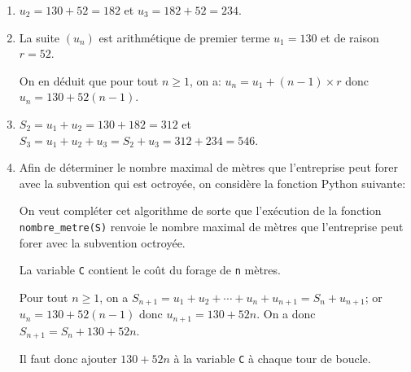 \begin{enumerate}
\item  $u_2=130+52=182$ et $u_3=182+52= 234$.
\item La suite $\left(u_n\right)$ est arithmétique de premier terme $u_1=130$ et de raison $r=52$.



On en déduit que pour tout $n\geqslant 1$, on a: $u_n=u_1+(n-1)\times r$ donc $u_n=130+52(n-1)$.

\item $S_2= u_1+u_2 = 130+182=312$ et $S_3=u_1+u_2+u_3 = S_2+u_3=312+234=546$.

\item Afin de déterminer le nombre maximal de mètres que l'entreprise peut forer avec la subvention qui est octroyée, on considère la fonction Python suivante:

\begin{center}
\end{center}

On veut compléter cet algorithme de sorte que l'exécution de la fonction \verb!nombre_metre(S)! renvoie le nombre maximal de mètres que l'entreprise peut forer avec la subvention octroyée. 

La variable \texttt{C} contient le coût du forage de \texttt{n} mètres.

Pour tout $n\geqslant 1$, on a $S_{n+1}= u_1+u_2+\cdots + u_n + u_{n+1} = S_n+u_{n+1}$; or $u_n=130+52\left (n-1\right )$ donc $u_{n+1} =130+52n$. On a donc $S_{n+1} = S_n + 130 + 52n$.

Il faut donc ajouter $130+52n$ à la variable  \texttt{C} à chaque tour de boucle.

\begin{center}
\end{center}


\end{enumerate}
